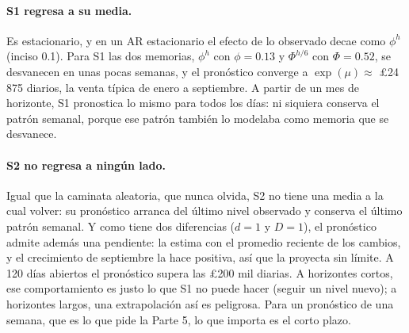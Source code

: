\paragraph{S1 regresa a su media.} Es estacionario, y en un AR estacionario el
efecto de lo observado decae como $\phi^h$ (inciso 0.1). Para S1 las dos
memorias, $\phi^h$ con $\phi=0.13$ y $\Phi^{h/6}$ con $\Phi=0.52$, se
desvanecen en unas pocas semanas, y el pronóstico converge a
$\exp(\mu)\approx$ \pounds24\,875 diarios, la venta típica de enero a
septiembre. A partir de un mes de horizonte, S1 pronostica lo mismo para
todos los días: ni siquiera conserva el patrón semanal, porque ese patrón
también lo modelaba como memoria que se desvanece.

\paragraph{S2 no regresa a ningún lado.} Igual que la caminata aleatoria, que
nunca olvida, S2 no tiene una media a la cual volver: su pronóstico arranca
del último nivel observado y conserva el último patrón semanal. Y como tiene
dos diferencias ($d=1$ y $D=1$), el pronóstico admite además una pendiente: la
estima con el promedio reciente de los cambios, y el crecimiento de septiembre
la hace positiva, así que la proyecta sin límite. A 120 días abiertos el
pronóstico supera las \pounds200 mil diarias. A horizontes cortos, ese
comportamiento es justo lo que S1 no puede hacer (seguir un nivel nuevo); a
horizontes largos, una extrapolación así es peligrosa. Para un pronóstico de
una semana, que es lo que pide la Parte 5, lo que importa es el corto plazo.
